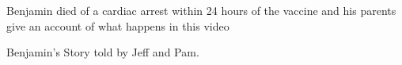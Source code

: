 Benjamin died of a cardiac arrest within 24 hours of the vaccine and his parents
give an account of what happens in this video

Benjamin’s Story told by Jeff and Pam.

